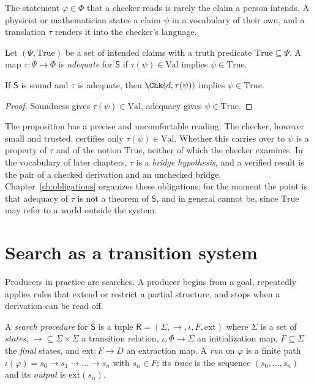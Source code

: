 The statement $\varphi\in\Phi$ that a checker reads is rarely the claim a person intends. A physicist or mathematician states a claim $\psi$ in a vocabulary of their own, and a translation $\tau$ renders it into the checker's language.

\begin{definition}
\label{def:adequate}
Let $(\Psi,\mathrm{True})$ be a set of intended claims with a truth predicate $\mathrm{True}\subseteq\Psi$. A map $\tau:\Psi\to\Phi$ is \emph{adequate} for $\mathsf{S}$ if $\tau(\psi)\in\mathrm{Val}$ implies $\psi\in\mathrm{True}$.
\end{definition}

\begin{proposition}
\label{prop:composition}
If $\mathsf{S}$ is sound and $\tau$ is adequate, then $\Chk(d,\tau(\psi))$ implies $\psi\in\mathrm{True}$.
\end{proposition}

\begin{proof}
Soundness gives $\tau(\psi)\in\mathrm{Val}$, adequacy gives $\psi\in\mathrm{True}$.
\end{proof}

The proposition has a precise and uncomfortable reading. The checker, however small and trusted, certifies only $\tau(\psi)\in\mathrm{Val}$. Whether this carries over to $\psi$ is a property of $\tau$ and of the notion $\mathrm{True}$, neither of which the checker examines. In the vocabulary of later chapters, $\tau$ is a \emph{bridge hypothesis}, and a verified result is the pair of a checked derivation and an unchecked bridge. Chapter~\ref{ch:obligations} organizes these obligations; for the moment the point is that adequacy of $\tau$ is not a theorem of $\mathsf{S}$, and in general cannot be, since $\mathrm{True}$ may refer to a world outside the system.

\section{Search as a transition system}
\label{sec:search-ts}

Producers in practice are searches. A producer begins from a goal, repeatedly applies rules that extend or restrict a partial structure, and stops when a derivation can be read off.

\begin{definition}
\label{def:search}
A \emph{search procedure} for $\mathsf{S}$ is a tuple $\mathsf{R}=(\Sigma,\to,\iota,F,\mathrm{ext})$ where $\Sigma$ is a set of \emph{states}, ${\to}\subseteq\Sigma\times\Sigma$ a transition relation, $\iota:\Phi\to\Sigma$ an initialization map, $F\subseteq\Sigma$ the \emph{final} states, and $\mathrm{ext}:F\to D$ an extraction map. A \emph{run} on $\varphi$ is a finite path $\iota(\varphi)=s_0\to s_1\to\dots\to s_n$ with $s_n\in F$; its \emph{trace} is the sequence $(s_0,\dots,s_n)$ and its \emph{output} is $\mathrm{ext}(s_n)$.
\end{definition}

